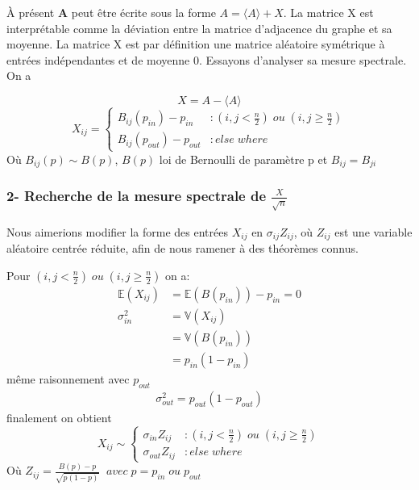 À présent \textbf{A} peut être écrite sous la forme $A = \langle A \rangle + X$.
La matrice X est interprétable comme la déviation entre la matrice d'adjacence du graphe et sa moyenne.
La matrice X est par définition une matrice aléatoire symétrique à entrées indépendantes et de moyenne 0.
Essayons d'analyser sa mesure spectrale.
On a 

\begin{equation} \label{eq: X}
X = A - \langle A \rangle
\end{equation}
\begin{equation}
	X_{ij}  = \left\{
	\begin{array}{lr}
		B_{ij}(p_{in}) - p_{in} & : (i,j < \frac{n}{2}) \; ou \; (i,j \ge \frac{n}{2}) \\
		B_{ij}(p_{out}) - p_{out} & : else \; where
	\end{array}
\right.\nonumber
\end{equation}
Où $B_{ij}(p) \sim B(p)$, $B(p)$ loi de Bernoulli de paramètre p et $B_{ij} = B_{ji}$\\


\subsubsection*{2- Recherche de la mesure spectrale de $\frac{X}{\sqrt{n}}$}
Nous aimerions modifier la forme des entrées $X_{ij}$ en $\sigma_{ij} Z_{ij}$, où $Z_{ij}$ est une variable aléatoire centrée réduite, afin de nous ramener à des théorèmes connus.

Pour $(i,j < \frac{n}{2}) \; ou \; (i,j \ge \frac{n}{2}) $ on a:
\begin{align*}
\mathbb{E}(X_{ij}) &= \mathbb{E}(B(p_{in}))- p_{in} = 0\\
\sigma_{in}^2 &= \mathbb{V}(X_{ij}) \\ 
			  &= \mathbb{V}(B(p_{in})) \\
			  &= p_{in} (1 - p_{in})
\end{align*}
même raisonnement avec $p_{out}$ 
\begin{align*}
\sigma_{out}^2 =  p_{out} (1 - p_{out})
\end{align*}
finalement on obtient 
\begin{equation}
	X_{ij} \sim \left\{
	\begin{array}{lr}
		\sigma_{in} Z_{ij} & : (i,j < \frac{n}{2}) \; ou \; (i,j \ge \frac{n}{2}) \\
		\sigma_{out} Z_{ij} & : else \; where
	\end{array}
\right.\nonumber
\end{equation}
Où $Z_{ij} = \frac{B(p) - p}{\sqrt{p(1-p)}} \;\;avec \; p = p_{in} \; ou \; p_{out}$\\

